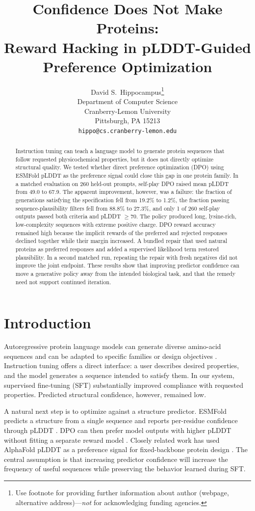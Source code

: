 \documentclass{article}
\title{Confidence Does Not Make Proteins:\\
Reward Hacking in pLDDT-Guided Preference Optimization}
\author{%
  David S.~Hippocampus\thanks{Use footnote for providing further information
    about author (webpage, alternative address)---\emph{not} for acknowledging
    funding agencies.} \\
  Department of Computer Science\\
  Cranberry-Lemon University\\
  Pittsburgh, PA 15213 \\
  \texttt{hippo@cs.cranberry-lemon.edu} \\
}
\begin{document}
\maketitle


\begin{abstract}
Instruction tuning can teach a language model to generate protein sequences
that follow requested physicochemical properties, but it does not directly
optimize structural quality. We tested whether direct preference optimization
(DPO) using ESMFold pLDDT as the preference signal could close this gap in one
protein family. In a matched evaluation on 260 held-out prompts, self-play DPO
raised mean pLDDT from 49.0 to 67.9. The apparent improvement, however, was a failure:
the fraction of generations satisfying the specification fell from 19.2\% to
1.2\%, the fraction passing sequence-plausibility filters fell from 88.8\% to
27.3\%, and only 1 of 260 self-play outputs passed both criteria and pLDDT $\geq 70$.
The policy produced long, lysine-rich, low-complexity sequences with extreme
positive charge. DPO reward accuracy remained high because the implicit
rewards of the preferred and rejected responses declined together while their
margin increased. A bundled repair that used natural proteins as preferred
responses and added a supervised likelihood term restored plausibility. In a second matched run,
repeating the repair with fresh negatives did not improve the joint endpoint. These results show that improving
predictor confidence can move a generative policy away from the intended
biological task, and that the remedy need not support continued iteration.
\end{abstract}



\section{Introduction}
Autoregressive protein language models can generate diverse amino-acid
sequences and can be adapted to specific families or design objectives
\citep{ferruz2022protgpt2,nijkamp2023progen2}. Instruction tuning offers a
direct interface: a user describes desired properties, and the model generates
a sequence intended to satisfy them. In our system, supervised fine-tuning
(SFT) substantially improved compliance with requested properties. Predicted structural confidence, however, remained low.

A natural next step is to optimize against a structure predictor. ESMFold
predicts a structure from a single sequence and reports per-residue confidence
through pLDDT \citep{lin2023esmfold}. DPO can then prefer model outputs with
higher pLDDT without fitting a separate reward model
\citep{rafailov2023dpo}. Closely related work has used AlphaFold pLDDT as a
preference signal for fixed-backbone protein design
\citep{xue2025residpo}. The central assumption is that increasing predictor
confidence will increase the frequency of useful sequences while preserving
the behavior learned during SFT.
\end{document}
